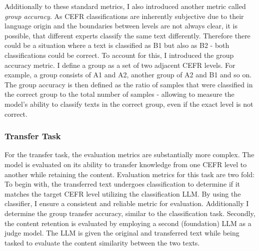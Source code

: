 Additionally to these standard metrics, I also introduced another metric called \textit{group accuracy}. As CEFR classifications are inherently subjective due to their language origin \citep{Siddhant2020} and the boundaries between levels are not always clear, it is possible, that different experts classify the same text differently. Therefore there could be a situation where a text is classified as B1 but also as B2 - both classifications could be correct. To account for this, I introduced the group accuracy metric. I define a group as a set of two adjacent CEFR levels. For example, a group consists of A1 and A2, another group of A2 and B1 and so on. The group accuracy is then defined as the ratio of samples that were classified in the correct group to the total number of samples - allowing to measure the model's ability to classify texts in the correct group, even if the exact level is not correct.

\subsubsection*{Transfer Task}
\label{sss:transfer_task}
For the transfer task, the evaluation metrics are substantially more complex. The model is evaluated on its ability to transfer knowledge from one CEFR level to another while retaining the content. Evaluation metrics for this task are two fold:
To begin with, the transferred text undergoes classification to determine if it matches the target CEFR level utilizing the classification LLM. By using the classifier, I ensure a consistent and reliable metric for evaluation. Additionally I determine the group transfer accuracy, similar to the classification task.
Secondly, the content retention is evaluated by employing a second (foundation) LLM as a judge model. The LLM is given the original and transferred text while being tasked to evaluate the content similarity between the two texts.

